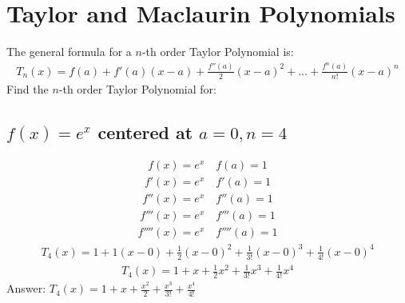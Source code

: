 \documentclass{article}
\begin{document}
\section{Taylor and Maclaurin Polynomials}
The general formula for a $n$-th order Taylor Polynomial is:
\begin{align*}
	T_n(x) = f(a) + f'(a)(x - a) + \frac{f''(a)}{2} (x - a)^2 + \dots + \frac{f^n(a)}{n!} (x - a)^n
\end{align*}
Find the $n$-th order Taylor Polynomial for:
\subsection{$f(x) = e^x$ centered at $a = 0, n = 4$}
\begin{align*}
	f(x) = e^x \quad f(a) = 1
\end{align*}
\begin{align*}
	f'(x) = e^x \quad f'(a) = 1
\end{align*}
\begin{align*}
	f''(x) = e^x \quad f''(a) = 1
\end{align*}
\begin{align*}
	f'''(x) = e^x \quad f'''(a) = 1
\end{align*}
\begin{align*}
	f''''(x) = e^x \quad f''''(a) = 1
\end{align*}
\begin{align*}
	T_4(x) = 1 + 1(x - 0) + \frac{1}{2} (x - 0)^2 + \frac{1}{3!} (x - 0)^3 + \frac{1}{4!} (x - 0)^4
\end{align*}
\begin{align*}
	T_4 (x) = 1 + x + \frac{1}{2}x^2 + \frac{1}{3!}x^3 + \frac{1}{4!}x^4
\end{align*}
Answer: $T_4 (x) = 1 + x + \frac{x^2}{2} + \frac{x^3}{3!} + \frac{x^4}{4!}$

\end{document}
